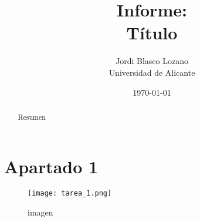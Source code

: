 \documentclass{article}
\title{Informe: \\ Título}
\author{
	Jordi Blasco Lozano \\
	\small Universidad de Alicante
}
\date{\today}
\begin{document}
	
	\maketitle

	\begin{abstract}
	\noindent Resumen
	\end{abstract}

	\tableofcontents

	\newpage

	\section{Apartado 1}

    \begin{figure}[h!]
	\centering
	\texttt{[image: tarea\_1.png]}
	\caption{imagen}
	\end{figure}
\end{document}
